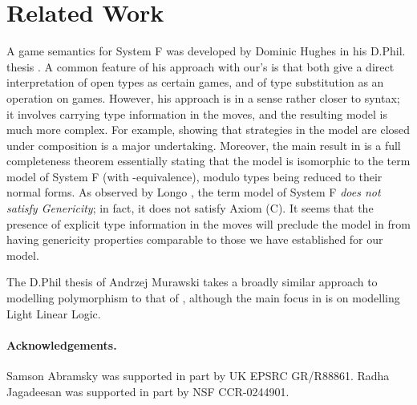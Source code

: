 \documentclass[a4paper,11pt]{article}
\begin{document}
\section{Related Work}
A game semantics for System F was developed by Dominic Hughes in his D.Phil. thesis
\cite{Hug99}. A common feature of his approach with
our's is that both give a direct interpretation of open types as certain games,
and of type substitution as an operation on games. However, his approach is in a sense rather closer to syntax; it
involves carrying type information in the moves, and the resulting model
is much more complex. For example, showing that strategies in the
model are closed under composition is a major undertaking. Moreover,
the main result in \cite{Hug99} is a full completeness theorem
essentially stating that the model is isomorphic to the term model of
System F (with -equivalence), modulo types being reduced to
their normal forms. As observed by Longo \cite{Lon95}, the term model
of System F \emph{does not satisfy Genericity}; in fact, it does not
satisfy Axiom (C). It seems that the presence of explicit type
information in the moves will preclude the model in \cite{Hug99} from
having  genericity properties comparable to those we have established for
our model.

The D.Phil thesis of Andrzej Murawski \cite{Mur01} takes a broadly similar approach
to modelling polymorphism to that of \cite{Hug99}, although the main
focus in \cite{Mur01} is on modelling Light Linear Logic.

\paragraph{Acknowledgements.}  Samson Abramsky was supported in part
by UK EPSRC GR/R88861. Radha Jagadeesan was supported in part by NSF
CCR-0244901.
\end{document}
